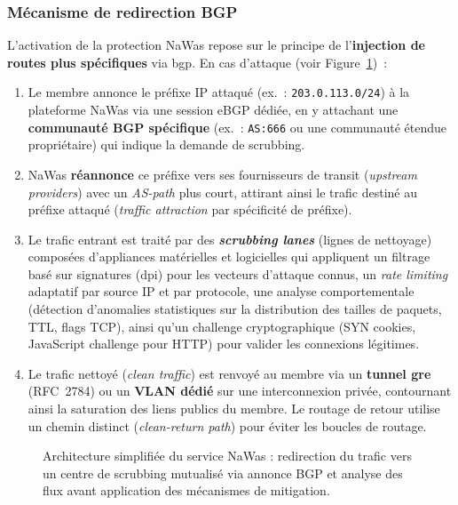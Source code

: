 \subsubsection{Mécanisme de redirection BGP}

L'activation de la protection NaWas repose sur le principe de l'\textbf{injection de routes plus spécifiques} via \gls{bgp}. En cas d'attaque (voir Figure~\ref{fig:nawas_bgp})~:

\begin{enumerate}
    \item Le membre annonce le préfixe IP attaqué (ex.~: \texttt{203.0.113.0/24}) à la plateforme NaWas via une session eBGP dédiée, en y attachant une \textbf{communauté BGP spécifique} (ex.~: \texttt{AS:666} ou une communauté étendue propriétaire) qui indique la demande de scrubbing.

    \item NaWas \textbf{réannonce} ce préfixe vers ses fournisseurs de transit (\textit{upstream providers}) avec un \textit{AS-path} plus court, attirant ainsi le trafic destiné au préfixe attaqué (\textit{traffic attraction} par spécificité de préfixe).

    \item Le trafic entrant est traité par des \textbf{\textit{scrubbing lanes}} (lignes de nettoyage) composées d'appliances matérielles et logicielles qui appliquent un filtrage basé sur signatures (\gls{dpi}) pour les vecteurs d'attaque connus, un \textit{rate limiting} adaptatif par source IP et par protocole, une analyse comportementale (détection d'anomalies statistiques sur la distribution des tailles de paquets, TTL, flags TCP), ainsi qu'un challenge cryptographique (SYN cookies, JavaScript challenge pour HTTP) pour valider les connexions légitimes.

    \item Le trafic nettoyé (\textit{clean traffic}) est renvoyé au membre via un \textbf{tunnel \gls{gre}} (RFC~2784) ou un \textbf{VLAN dédié} sur une interconnexion privée, contournant ainsi la saturation des liens publics du membre. Le routage de retour utilise un chemin distinct (\textit{clean-return path}) pour éviter les boucles de routage.
\end{enumerate}

\begin{figure}[H]
\centering
{}

\caption{Architecture simplifiée du service NaWas : redirection du trafic vers un centre de scrubbing mutualisé via annonce BGP et analyse des flux avant application des mécanismes de mitigation.}

\label{fig:nawas_bgp}
\end{figure}

